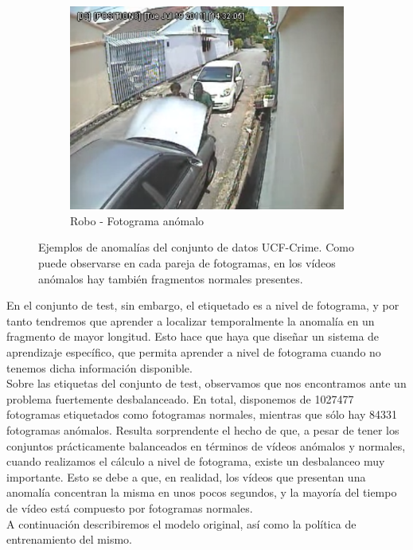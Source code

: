 \documentclass[../main.tex]{memoir}
\begin{document}
\begin{figure}[hbtp]
\begin{subfigure}{0.48\textwidth}
    \includegraphics[width=\linewidth]{images/ucf-examples/stealing-abnormal}
    \caption{Robo - Fotograma anómalo}
  \end{subfigure}
  \caption{Ejemplos de anomalías del conjunto de datos UCF-Crime. Como
    puede observarse en cada pareja de fotogramas, en los vídeos
    anómalos hay también fragmentos normales presentes.}
  \label{fig:ucf-anomaly-examples}
\end{figure}

En el conjunto de test, sin embargo, el etiquetado es a nivel de
fotograma, y por tanto tendremos que aprender a localizar
temporalmente la anomalía en un fragmento de mayor longitud. Esto hace
que haya que diseñar un sistema de aprendizaje específico, que permita
aprender a nivel de fotograma cuando no tenemos dicha información
disponible.\\

Sobre las etiquetas del conjunto de test, observamos que nos
encontramos ante un problema fuertemente desbalanceado. En total,
disponemos de 1027477 fotogramas etiquetados como fotogramas normales,
mientras que sólo hay 84331 fotogramas anómalos. Resulta sorprendente
el hecho de que, a pesar de tener los conjuntos prácticamente
balanceados en términos de vídeos anómalos y normales, cuando
realizamos el cálculo a nivel de fotograma, existe un desbalanceo muy
importante. Esto se debe a que, en realidad, los vídeos que presentan
una anomalía concentran la misma en unos pocos segundos, y la mayoría
del tiempo de vídeo está compuesto por fotogramas normales.\\

A continuación describiremos el modelo original, así como la política
de entrenamiento del mismo.
\end{document}
